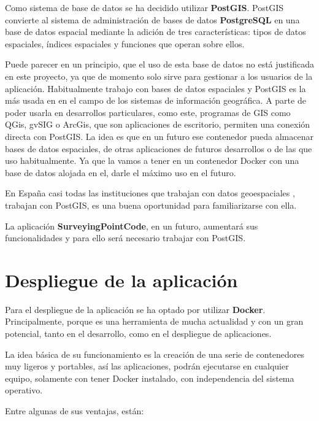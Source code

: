 Como sistema de base de datos se ha decidido utilizar \textbf{PostGIS}. PostGIS convierte al sistema de administración de bases de datos \textbf{PostgreSQL} en una base de datos espacial mediante la adición de tres características: tipos de datos espaciales, índices espaciales y funciones que operan sobre ellos.

Puede parecer en un principio, que el uso de esta base de datos no está justificada en este proyecto, ya que de momento solo sirve para gestionar a los usuarios de la aplicación. Habitualmente trabajo con bases de datos espaciales y PostGIS es la más usada en en el campo de los sistemas de información geográfica. A parte de poder usarla en desarrollos particulares, como este, programas de GIS como QGis, gvSIG o ArcGis, que son aplicaciones de escritorio,  permiten una conexión directa con PostGIS. 
La idea es que en un futuro ese contenedor pueda almacenar bases de datos espaciales, de otras aplicaciones de futuros desarrollos o de las que uso habitualmente. Ya que la vamos a tener en un contenedor Docker con una base de datos alojada en el, darle el máximo uso en el futuro.

En España casi todas las instituciones que trabajan con datos geoespaciales , trabajan con PostGIS, es una buena oportunidad para familiarizarse con ella.

La aplicación \textbf{SurveyingPointCode}, en un futuro, aumentará sus funcionalidades y para ello será necesario trabajar con PostGIS.

\section{Despliegue de la aplicación}

Para el despliegue de la aplicación se ha optado por utilizar \textbf{Docker}. Principalmente, porque es una herramienta de mucha actualidad y con un gran potencial, tanto en el desarrollo, como en el despliegue de aplicaciones.

La idea básica de su funcionamiento es la creación de una serie de contenedores muy ligeros y portables, así las aplicaciones, podrán ejecutarse en cualquier equipo, solamente con tener Docker instalado, con independencia del sistema operativo.

Entre algunas de sus ventajas, están:

